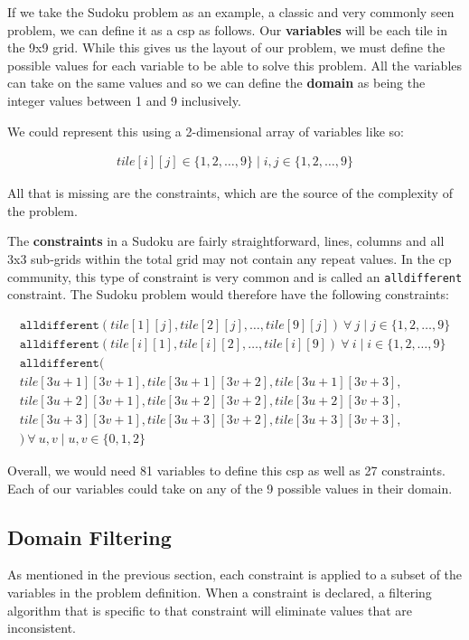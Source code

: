 \documentclass[../Document.tex]{subfiles}
\begin{document}
If we take the Sudoku problem as an example, a classic and very commonly seen problem, we can define it as a \gls{csp} as follows.
Our \textbf{variables} will be each tile in the 9x9 grid. While this gives us the layout of our problem, we must define the possible values for each variable to be able to solve this problem.
All the variables can take on the same values and so we can define the \textbf{domain} as being the integer values between 1 and 9 inclusively. 

We could represent this using a 2-dimensional array of variables like so:

\begin{align}
    tile[i][j] \in \{1,2,\dots,9\} \mid i,j \in \{1,2,\dots,9\}
\end{align}

All that is missing are the constraints, which are the source of the complexity of the problem.

The \textbf{constraints} in a Sudoku are fairly straightforward, lines, columns and all 3x3 sub-grids within the total grid may not contain any repeat values.
In the \gls{cp} community, this type of constraint is very common and is called an \texttt{alldifferent} constraint. The Sudoku problem would therefore have the following constraints:

\begin{gather*}
    \texttt{alldifferent}(tile[1][j], tile[2][j], \dots, tile[9][j])\ \forall\ j \mid j \in \{1,2,\dots,9\} \\
    \texttt{alldifferent}(tile[i][1], tile[i][2], \dots, tile[i][9])\ \forall\ i \mid i \in \{1,2,\dots,9\} \\
    \texttt{alldifferent}(\\
        tile[3u+1][3v+1],tile[3u+1][3v+2],tile[3u+1][3v+3],\\
        tile[3u+2][3v+1],tile[3u+2][3v+2],tile[3u+2][3v+3],\\
        tile[3u+3][3v+1],tile[3u+3][3v+2],tile[3u+3][3v+3],\\
    )\ \forall\ u,v \mid u,v \in \{0,1,2\}
\end{gather*}

Overall, we would need 81 variables to define this \gls{csp} as well as 27 constraints. Each of our variables could take on any of the 9 possible values in their domain.

\subsection{Domain Filtering}
As mentioned in the previous section, each constraint is applied to a subset of the variables in the problem definition. When a constraint is declared, a filtering algorithm that is specific to that constraint will eliminate values that are inconsistent.
\end{document}
